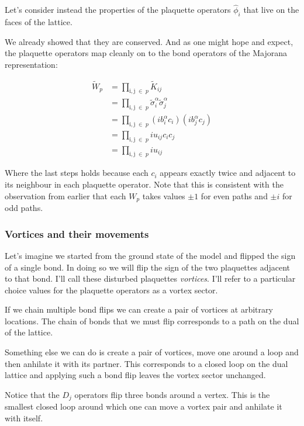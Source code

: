 Let's consider instead the properties of the plaquette operators
\(\hat{\phi}_i\) that live on the faces of the lattice.

We already showed that they are conserved. And as one might hope and
expect, the plaquette operators map cleanly on to the bond operators of
the Majorana representation:

\[\begin{aligned}
\tilde{W}_p &= \prod_{\mathrm{i,j}\; \in\; p} \tilde{K}_{ij}\\
            &= \prod_{\mathrm{i,j}\; \in\; p} \tilde{\sigma}_i^\alpha \tilde{\sigma}_j^\alpha\\
            &= \prod_{\mathrm{i,j}\; \in\; p} (ib^\alpha_i c_i)(ib^\alpha_j c_j)\\
            &= \prod_{\mathrm{i,j}\; \in\; p} i u_{ij} c_i c_j\\
            &= \prod_{\mathrm{i,j}\; \in\; p} i u_{ij}
\end{aligned}\]

Where the last steps holds because each \(c_i\) appears exactly twice
and adjacent to its neighbour in each plaquette operator. Note that this
is consistent with the observation from earlier that each \(W_p\) takes
values \(\pm 1\) for even paths and \(\pm i\) for odd paths.

\hypertarget{vortices-and-their-movements}{%
\subsubsection{Vortices and their
movements}\label{vortices-and-their-movements}}

Let's imagine we started from the ground state of the model and flipped
the sign of a single bond. In doing so we will flip the sign of the two
plaquettes adjacent to that bond. I'll call these disturbed plaquettes
\emph{vortices}. I'll refer to a particular choice values for the
plaquette operators as a vortex sector.

If we chain multiple bond flips we can create a pair of vortices at
arbitrary locations. The chain of bonds that we must flip corresponds to
a path on the dual of the lattice.

Something else we can do is create a pair of vortices, move one around a
loop and then anhilate it with its partner. This corresponds to a closed
loop on the dual lattice and applying such a bond flip leaves the vortex
sector unchanged.

Notice that the \(D_j\) operators flip three bonds around a vertex. This
is the smallest closed loop around which one can move a vortex pair and
anhilate it with itself.

